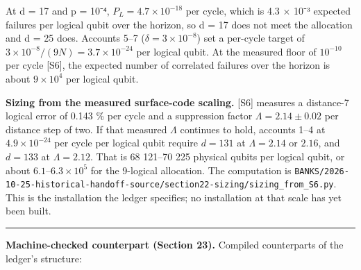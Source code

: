 \documentclass[
]{article}
\begin{document}
At d = 17 and p = 10⁻⁴, \(P_L = 4.7 \times 10^{-18}\) per cycle, which
is 4.3 × 10⁻³ expected failures per logical qubit over the horizon, so d
= 17 does not meet the allocation and d = 25 does. Accounts 5--7
(\(\delta = 3 \times 10^{-8}\)) set a per-cycle target of
\(3 \times 10^{-8} / (9N) = 3.7 \times 10^{-24}\) per logical qubit. At
the measured floor of \(10^{-10}\) per cycle {[}S6{]}, the expected
number of correlated failures over the horizon is about
\(9 \times 10^{4}\) per logical qubit.

\textbf{Sizing from the measured surface-code scaling.} {[}S6{]}
measures a distance-7 logical error of 0.143 \% per cycle and a
suppression factor \(\Lambda=2.14\pm0.02\) per distance step of two. If
that measured \(\Lambda\) continues to hold, accounts 1--4 at
\(4.9\times10^{-24}\) per cycle per logical qubit require \(d=131\) at
\(\Lambda=2.14\) or \(2.16\), and \(d=133\) at \(\Lambda=2.12\). That is
68 121--70 225 physical qubits per logical qubit, or about
\(6.1\)--\(6.3\times10^{5}\) for the 9-logical allocation. The
computation is
\texttt{B\allowbreak{}A\allowbreak{}N\allowbreak{}K\allowbreak{}S\allowbreak{}/\allowbreak{}2\allowbreak{}0\allowbreak{}2\allowbreak{}6\allowbreak{}-\allowbreak{}1\allowbreak{}0\allowbreak{}-\allowbreak{}2\allowbreak{}5\allowbreak{}-\allowbreak{}h\allowbreak{}i\allowbreak{}s\allowbreak{}t\allowbreak{}o\allowbreak{}r\allowbreak{}i\allowbreak{}c\allowbreak{}a\allowbreak{}l\allowbreak{}-\allowbreak{}h\allowbreak{}a\allowbreak{}n\allowbreak{}d\allowbreak{}o\allowbreak{}f\allowbreak{}f\allowbreak{}-\allowbreak{}s\allowbreak{}o\allowbreak{}u\allowbreak{}r\allowbreak{}c\allowbreak{}e\allowbreak{}/\allowbreak{}s\allowbreak{}e\allowbreak{}c\allowbreak{}t\allowbreak{}i\allowbreak{}o\allowbreak{}n\allowbreak{}2\allowbreak{}2\allowbreak{}-\allowbreak{}s\allowbreak{}i\allowbreak{}z\allowbreak{}i\allowbreak{}n\allowbreak{}g\allowbreak{}/\allowbreak{}s\allowbreak{}i\allowbreak{}z\allowbreak{}i\allowbreak{}n\allowbreak{}g\allowbreak{}\_\allowbreak{}f\allowbreak{}r\allowbreak{}o\allowbreak{}m\allowbreak{}\_\allowbreak{}S\allowbreak{}6\allowbreak{}.\allowbreak{}p\allowbreak{}y}.
This is the installation the ledger specifies; no installation at that
scale has yet been built.

\begin{center}\rule{0.5\linewidth}{0.5pt}\end{center}

\textbf{Machine-checked counterpart (Section 23).} Compiled counterparts
of the ledger's structure:
\end{document}
